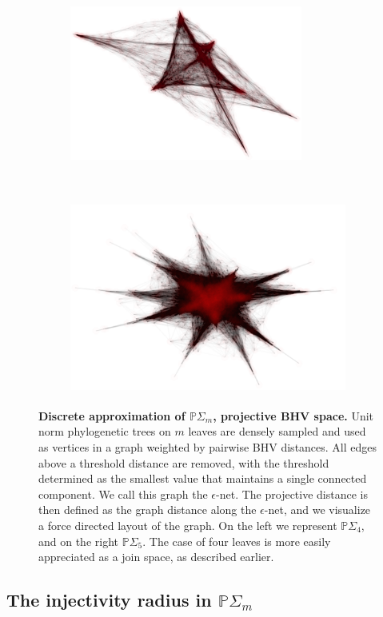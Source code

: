 \documentclass[a4paper,11pt]{article}
\begin{document}
\begin{figure}
    \begin{subfigure}{0.5\linewidth}
    \centering
    \includegraphics[height=2in]{../figures/epsilon_net_quad.png}
    \end{subfigure}
    ~
    \begin{subfigure}{0.5\linewidth}
    \centering
    \includegraphics[height=2.5in]{../figures/epsilon_net_quint.png}
    \end{subfigure}

    \caption{{\bf Discrete approximation of $\mathbb{P}\Sigma_m$, projective BHV space.} Unit norm phylogenetic trees on $m$ leaves are densely sampled and used as vertices in a graph weighted by pairwise BHV distances. All edges above a threshold distance are removed, with the threshold determined as the smallest value that maintains a single connected component. We call this graph the  $\epsilon$-net. The projective distance is then defined as the graph distance along the $\epsilon$-net, and we visualize a force directed layout of the graph. On the left we represent $\mathbb{P}\Sigma_4$, and on the right $\mathbb{P}\Sigma_5$. The case of four leaves is more easily appreciated as a join space, as described earlier.}
     \label{fig:epsilon_net}
\end{figure}

\subsection{The injectivity radius in $\mathbb{P}\Sigma_m$}\label{sec:inj}
\end{document}
